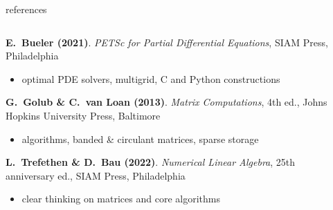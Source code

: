 \documentclass[10pt,
               svgnames,
               hyperref={colorlinks,citecolor=DeepPink4,linkcolor=FireBrick,urlcolor=Maroon},
               usepdftitle=false]{beamer}
\begin{document}
\begin{frame}{references}

\begin{columns}
\begin{column}{0.8\textwidth}
\begin{itemize}
{\small
\item[] \textbf{E.~Bueler (2021)}. \emph{PETSc for Partial Differential Equations}, SIAM Press, Philadelphia
    \begin{itemize}
    \item[$\circ$] optimal PDE solvers, multigrid, C and Python constructions
    \end{itemize}
\item[] \textbf{G.~Golub \& C.~van Loan (2013)}. \emph{Matrix Computations}, 4th ed., Johns Hopkins University Press, Baltimore
    \begin{itemize}
    \item[$\circ$] algorithms, banded \& circulant matrices, sparse storage
    \end{itemize}
\item[] \textbf{L.~Trefethen \& D.~Bau (2022)}. \emph{Numerical Linear Algebra}, 25th anniversary ed., SIAM Press, Philadelphia
    \begin{itemize}
    \item[$\circ$] clear thinking on matrices and core algorithms
    \end{itemize}
}
\end{itemize}
\end{column}
\begin{column}{0.17\textwidth}

\end{column}
\end{columns}
\end{frame}
\end{document}
